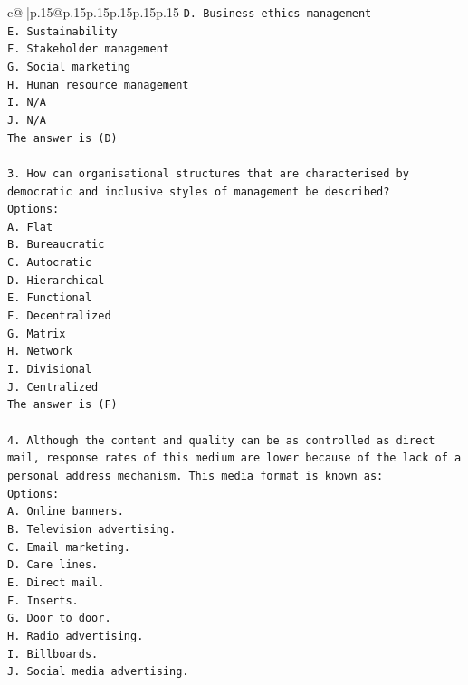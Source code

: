 \documentclass{article}
\begin{document}
{\begin{supertabular}{c@{$\;$}|p{.15\linewidth}@{}p{.15\linewidth}p{.15\linewidth}p{.15\linewidth}p{.15\linewidth}p{.15\linewidth}}
{{{\texttt{D. Business ethics management} \\
\texttt{E. Sustainability} \\
\texttt{F. Stakeholder management} \\
\texttt{G. Social marketing} \\
\texttt{H. Human resource management} \\
\texttt{I. N/A} \\
\texttt{J. N/A} \\
\texttt{The answer is (D)} \\
\\ 
\texttt{3. How can organisational structures that are characterised by democratic and inclusive styles of management be described?} \\
\texttt{Options:} \\
\texttt{A. Flat} \\
\texttt{B. Bureaucratic} \\
\texttt{C. Autocratic} \\
\texttt{D. Hierarchical} \\
\texttt{E. Functional} \\
\texttt{F. Decentralized} \\
\texttt{G. Matrix} \\
\texttt{H. Network} \\
\texttt{I. Divisional} \\
\texttt{J. Centralized} \\
\texttt{The answer is (F)} \\
\\ 
\texttt{4. Although the content and quality can be as controlled as direct mail, response rates of this medium are lower because of the lack of a personal address mechanism. This media format is known as:} \\
\texttt{Options:} \\
\texttt{A. Online banners.} \\
\texttt{B. Television advertising.} \\
\texttt{C. Email marketing.} \\
\texttt{D. Care lines.} \\
\texttt{E. Direct mail.} \\
\texttt{F. Inserts.} \\
\texttt{G. Door to door.} \\
\texttt{H. Radio advertising.} \\
\texttt{I. Billboards.} \\
\texttt{J. Social media advertising.} \\
}}}
\end{supertabular}}
\end{document}
